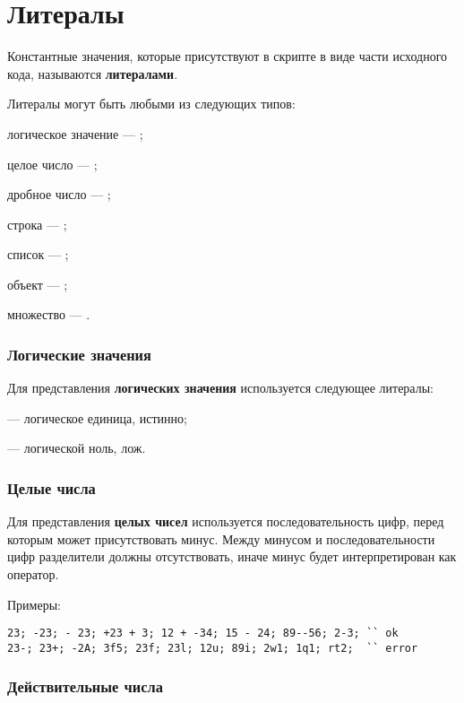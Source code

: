 \section{Литералы}

Константные значения, которые присутствуют в скрипте в виде части исходного кода, называются {\bf литералами}.

Литералы могут быть любыми из следующих типов:

\begin{icItems}
	\item
		логическое значение — \bool{};
	\item
		целое число — \integer{};
	\item
		дробное число — \double{};
	\item
		строка — \str{};
	\item
		список — \listtype{};
	\item
		объект — \object{};
	\item
		множество — \set{}.
\end{icItems}

\subsubsection{Логические значения}

Для представления {\bf логических значения} используется следующее литералы:
\begin{icItems}
	\item \true{} — логическое единица, истинно;
	\item \false{} — логической ноль, лож.
\end{icItems}

\subsubsection{Целые числа}

Для представления {\bf целых чисел} используется последовательность цифр, перед которым может присутствовать минус. Между минусом и последовательности цифр разделители должны отсутствовать, иначе минус будет интерпретирован как оператор.

\noindent Примеры:
\begin{verbatim}
23; -23; - 23; +23 + 3; 12 + -34; 15 - 24; 89--56; 2-3; `` ok
23-; 23+; -2А; 3f5; 23f; 23l; 12u; 89i; 2w1; 1q1; rt2;  `` error
\end{verbatim}

\subsubsection{Действительные числа}

